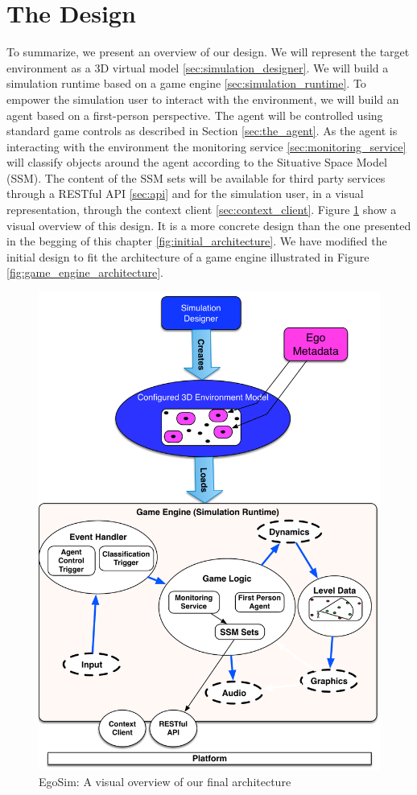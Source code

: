 \section{The Design} %
\label{sec:the_design}
To summarize, we present an overview of our design. We will represent the target environment as a 3D virtual model \ref{sec:simulation_designer}. We will build a simulation runtime based on a game engine \ref{sec:simulation_runtime}. To empower the simulation user to interact with the environment, we will build an agent based on a first-person perspective. The agent will be controlled using standard game controls as described in Section \ref{sec:the_agent}. As the agent is interacting with the environment the monitoring service \ref{sec:monitoring_service} will classify objects around the agent according to the Situative Space Model (SSM). The content of the SSM sets will be available for third party services through a RESTful API \ref{sec:api} and for the simulation user, in a visual representation, through the context client \ref{sec:context_client}. Figure \ref{fig:final_architecture} show a visual overview of this design. It is a more concrete design than the one presented in the begging of this chapter \ref{fig:initial_architecture}. We have modified the initial design to fit the architecture of a game engine illustrated in Figure \ref{fig:game_engine_architecture}.
\begin{figure}[H]
	\centering
	\includegraphics[width=\linewidth]{gfx/Chapter3/final_architecture}
	\caption{EgoSim: A visual overview of our final architecture}
	\label{fig:final_architecture}
\end{figure}
